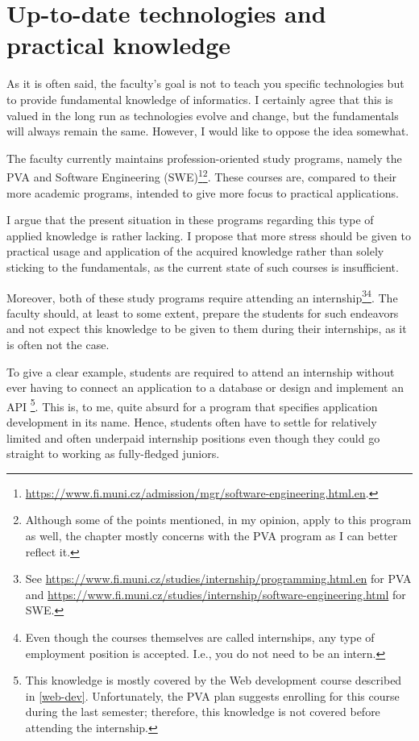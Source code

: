 \documentclass[
  digital,
  color,
  oneside,
  nosansbold,
  nocolorbold,
  lof,
  lot,
]{fithesis4}
\begin{document}
\section{Up-to-date technologies and practical knowledge}

As it is often said, the faculty's goal is not to teach you specific technologies but to provide fundamental knowledge of informatics. I certainly agree that this is valued in the long run as technologies evolve and change, but the fundamentals will always remain the same. However, I would like to oppose the idea somewhat.

The faculty currently maintains profession-oriented study programs, namely the PVA and Software Engineering (SWE)\footnote{\url{https://www.fi.muni.cz/admission/mgr/software-engineering.html.en}.}\footnote{Although some of the points mentioned, in my opinion, apply to this program as well, the chapter mostly concerns with the PVA program as I can better reflect it.}. These courses are, compared to their more academic programs, intended to give more focus to practical applications.

I argue that the present situation in these programs regarding this type of applied knowledge is rather lacking. I propose that more stress should be given to practical usage and application of the acquired knowledge rather than solely sticking to the fundamentals, as the current state of such courses is insufficient.

Moreover, both of these study programs require attending an internship\footnote{See \url{https://www.fi.muni.cz/studies/internship/programming.html.en} for PVA and \url{https://www.fi.muni.cz/studies/internship/software-engineering.html} for SWE.}\footnote{Even though the courses themselves are called internships, any type of employment position is accepted. I.e., you do not need to be an intern.}. The faculty should, at least to some extent, prepare the students for such endeavors and not expect this knowledge to be given to them during their internships, as it is often not the case. 

To give a clear example, students are required to attend an internship without ever having to connect an application to a database or design and implement an API \footnote{This knowledge is mostly covered by the Web development course described in \cref{web-dev}. Unfortunately, the PVA plan suggests enrolling for this course during the last semester; therefore, this knowledge is not covered before attending the internship.}. This is, to me, quite absurd for a program that specifies application development in its name. Hence, students often have to settle for relatively limited and often underpaid internship positions even though they could go straight to working as fully-fledged juniors.
\end{document}
